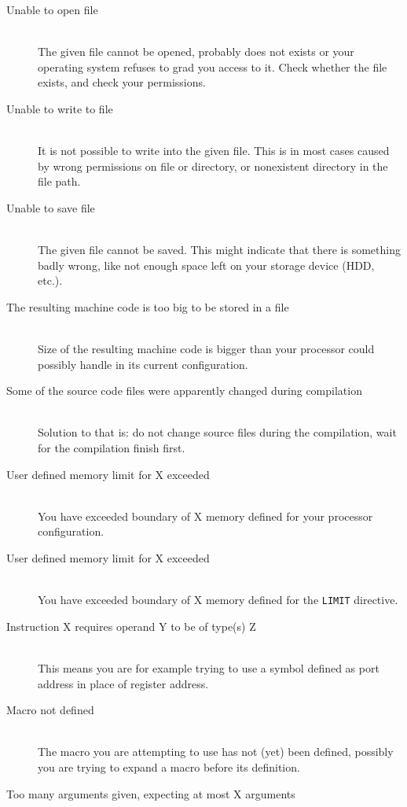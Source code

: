     \begin{description}
        \item[Unable to open file]~\\
            The given file cannot be opened, probably does not exists or your operating system refuses to grad you access to it. Check whether the file exists, and check your permissions.
        \item[Unable to write to file]~\\
            It is not possible to write into the given file. This is in most cases caused by wrong permissions on file or directory, or nonexistent directory in the file path.
        \item[Unable to save file]~\\
            The given file cannot be saved. This might indicate that there is something badly wrong, like not enough space left on your storage device (HDD, etc.).
        \item[The resulting machine code is too big to be stored in a file]~\\
            Size of the resulting machine code is bigger than your processor could possibly handle in its current configuration.
        \item[Some of the source code files were apparently changed during compilation]~\\
            Solution to that is: do not change source files during the compilation, wait for the compilation finish first.
        \item[User defined memory limit for X exceeded]~\\
            You have exceeded boundary of X memory defined for your processor configuration.
        \item[User defined memory limit for X exceeded]~\\
            You have exceeded boundary of X memory defined for the \texttt{LIMIT} directive.
        \item[Instruction X requires operand Y to be of type(s) Z]~\\
            This means you are for example trying to use a symbol defined as port address in place of register address.
        \item[Macro not defined ]~\\
            The macro you are attempting to use has not (yet) been defined, possibly you are trying to expand a macro before its definition.
        \item[Too many arguments given, expecting at most X arguments]~\\

\end{description}
